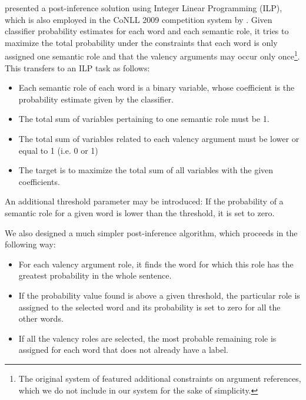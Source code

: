 \documentclass[12pt,notitlepage]{report}
\begin{document}
\citet{punyakanok04} presented a post-inference solution using Integer Linear Programming (ILP), which is also employed in the CoNLL 2009 competition system by \citet{che09}. Given classifier probability estimates for each word and each semantic role, it tries to maximize the total probability under the constraints that each word is only assigned one semantic role and that the valency arguments may occur only once\footnote{The original system of \citet{punyakanok04} featured additional constraints on argument references, which we do not include in our system for the sake of simplicity.}. This transfers to an ILP task as follows:
\begin{itemize}
    \item Each semantic role of each word is a binary variable, whose coefficient is the probability estimate given by the classifier.
    \item The total sum of variables pertaining to one semantic role must be 1.
    \item The total sum of variables related to each valency argument must be lower or equal to 1 (i.e. 0 or 1)
    \item The target is to maximize the total sum of all variables with the given coefficients.
\end{itemize}
An additional threshold parameter may be introduced: If the probability of a semantic role for a given word is lower than the threshold, it is set to zero.

We also designed a much simpler post-inference algorithm, which proceeds in the following way:
\begin{itemize}
    \item For each valency argument role, it finds the word for which this role has the greatest probability in the whole sentence.
    \item If the probability value found is above a given threshold, the particular role is assigned to the selected word and its probability is set to zero for all the other words.
    \item If all the valency roles are selected, the most probable remaining role is assigned for each word that does not already have a label.
\end{itemize}
\end{document}
